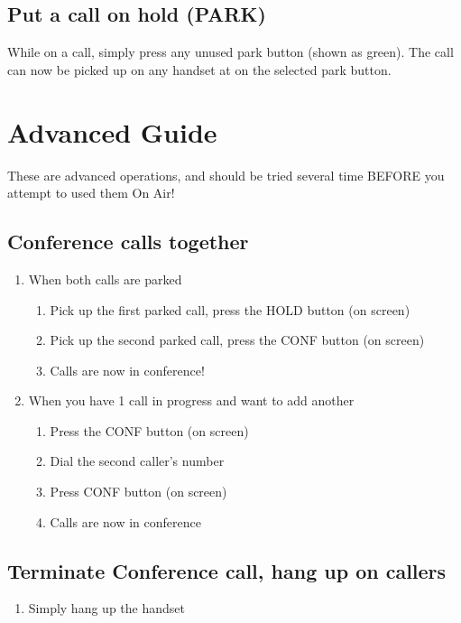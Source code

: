 \subsection{Put a call on hold (PARK)}
While on a call, simply press any unused park button (shown as green). The call can now be
picked up on any handset at on the selected park button.

\section{Advanced Guide}
These are advanced operations, and should be tried several time BEFORE you attempt to used
them On Air!

\subsection{Conference calls together}
\begin{enumerate}
	\item When both calls are parked
	\begin{enumerate}
		\item Pick up the first parked call, press the HOLD button (on screen)
		\item Pick up the second parked call, press the CONF button (on screen)
		\item Calls are now in conference!
	\end{enumerate}
	\item When you have 1 call in progress and want to add another
	\begin{enumerate}
		\item Press the CONF button (on screen)
		\item Dial the second caller's number
		\item Press CONF button (on screen)
		\item Calls are now in conference
	\end{enumerate}
\end{enumerate}

\subsection{Terminate Conference call, hang up on callers}
\begin{enumerate}
	\item Simply hang up the handset
\end{enumerate}

